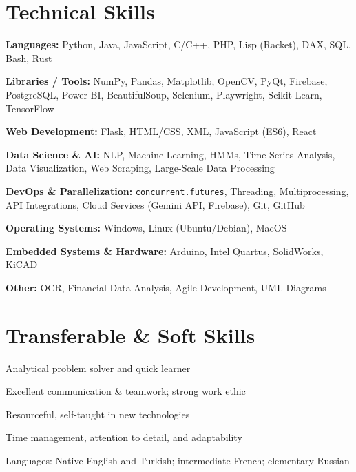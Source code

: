 \documentclass[11pt]{article}
\begin{document}


\section*{Technical Skills}
\begin{small}
\begin{compactitem}
    \item \textbf{Languages:} Python, Java, JavaScript, C/C++, PHP, Lisp (Racket), DAX, SQL, Bash, Rust
    \item \textbf{Libraries / Tools:} NumPy, Pandas, Matplotlib, OpenCV, PyQt, Firebase, PostgreSQL, Power BI, BeautifulSoup, Selenium, Playwright, Scikit-Learn, TensorFlow
    \item \textbf{Web Development:} Flask, HTML/CSS, XML, JavaScript (ES6), React 
    \item \textbf{Data Science \& AI:} NLP, Machine Learning, HMMs, Time-Series Analysis, Data Visualization, Web Scraping, Large-Scale Data Processing
    \item \textbf{DevOps \& Parallelization:} \texttt{concurrent.futures}, Threading, Multiprocessing, API Integrations, Cloud Services (Gemini API, Firebase), Git, GitHub
    \item \textbf{Operating Systems:} Windows, Linux (Ubuntu/Debian), MacOS
    \item \textbf{Embedded Systems \& Hardware:} Arduino, Intel Quartus, SolidWorks, KiCAD
    \item \textbf{Other:} OCR, Financial Data Analysis, Agile Development, UML Diagrams
\end{compactitem}
\end{small}



\section*{Transferable \& Soft Skills}
\begin{small}
\begin{compactitem}
    \item Analytical problem solver and quick learner
    \item Excellent communication \& teamwork; strong work ethic
    \item Resourceful, self-taught in new technologies
    \item Time management, attention to detail, and adaptability
    \item Languages: Native English and Turkish; intermediate French; elementary Russian
\end{compactitem}
\end{small}
\vfill
\end{document}
